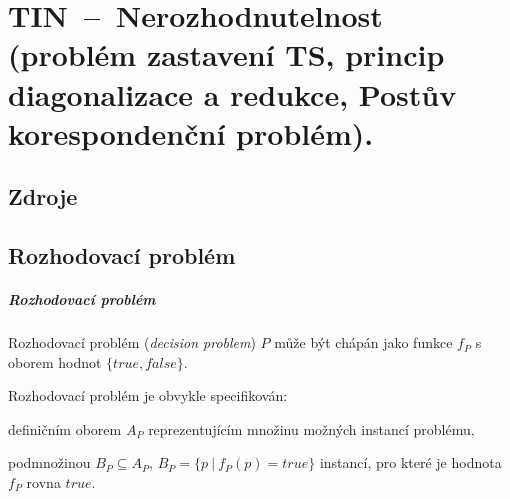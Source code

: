 

\graphicspath{{tin/nerozhodnutelnost/figures}}


\chapter{TIN~--~Nerozhodnutelnost (problém zastavení TS, princip diagonalizace a redukce, Postův korespondenční problém).}


\section{Zdroje}

\begin{compactitem}
    \item {}
    \item {}
    \item {}
    \item {}
\end{compactitem}


\section{Rozhodovací problém}

\paragraph*{Rozhodovací problém}

\begin{compactitem}
    \item Rozhodovací problém (\textit{decision problem}) $P$ může být chápán jako funkce $f_P$ s oborem hodnot $\{ true, false \}$.

    \item Rozhodovací problém je obvykle specifikován: \begin{compactitem}
        \item definičním oborem $A_P$ reprezentujícím množinu možných instancí problému,

        \item podmnožinou $B_P \subseteq A_P$, $B_P = \{ p ~|~ f_P(p) = true \}$ instancí, pro které je hodnota $f_P$ rovna $true$.
    \end{compactitem}
\end{compactitem}

